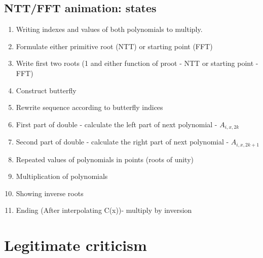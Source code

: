 \documentclass[12pt]{article}
\begin{document}
\subsection{NTT/FFT animation: states}
\begin {enumerate}
	\item Writing indexes and values of both polynomials to multiply.
	\item Formulate either primitive root (NTT) or starting point (FFT)
	\item Write first two roots (1 and either function of proot - NTT or starting point - FFT)
	\item Construct butterfly
	\item Rewrite sequence according to butterfly indices
	\item First part of double - calculate the left part of next polynomial - \(A_{i,x,2k}\)
	\item Second part of double - calculate the right part of next polynomial - \(A_{i,x,2k+1}\)
	\item Repeated values of polynomials in points (roots of unity)
	\item Multiplication of polynomials
	\item Showing inverse roots
	\item Ending (After interpolating C(x))- multiply by inversion
\end {enumerate}

\section{Legitimate criticism}
\end{document}
